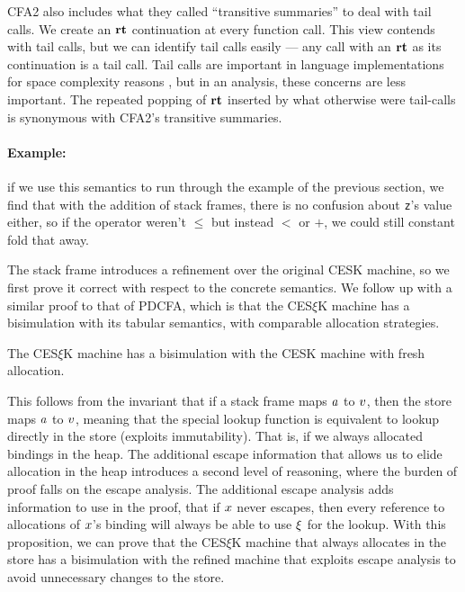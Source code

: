 CFA2 also includes what they called ``transitive summaries'' to deal with tail calls.
%
We create an $\mathbf{rt}$ continuation at every function call.
%
This view contends with tail calls, but we can identify tail calls easily --- any call with an $\mathbf{rt}$ as its continuation is a tail call.
%
Tail calls are important in language implementations for space complexity reasons \citep{ianjohnson:clinger:tail-calls:1998}, but in an analysis, these concerns are less important.
%
The repeated popping of $\mathbf{rt}$ inserted by what otherwise were tail-calls is synonymous with CFA2's transitive summaries.

\paragraph{Example:} if we use this semantics to run through the example of the previous section, we find that with the addition of stack frames, there is no confusion about \texttt{z}'s value either, so if the operator weren't $\le$ but instead $<$ or $+$, we could still constant fold that away.

The stack frame introduces a refinement over the original CESK machine, so we first prove it correct with respect to the concrete semantics.
%
We follow up with a similar proof to that of PDCFA, which is that the CES$\xi$K machine has a bisimulation with its tabular semantics, with comparable allocation strategies.
\begin{theorem}\label{thm:refinement}
  The CES$\xi$K machine has a bisimulation with the CESK machine with fresh allocation.
\end{theorem}
This follows from the invariant that if a stack frame maps $a$ to $v$, then the store maps $a$ to $v$, meaning that the special lookup function is equivalent to lookup directly in the store (exploits immutability).
%
That is, if we always allocated bindings in the heap.
%
The additional escape information that allows us to elide allocation in the heap introduces a second level of reasoning, where the burden of proof falls on the escape analysis.
%
The additional escape analysis adds information to use in the proof, that if $x$ never escapes, then every reference to allocations of $x$'s binding will always be able to use $\xi$ for the lookup.
%
With this proposition, we can prove that the CES$\xi$K machine that always allocates in the store has a bisimulation with the refined machine that exploits escape analysis to avoid unnecessary changes to the store.
%

